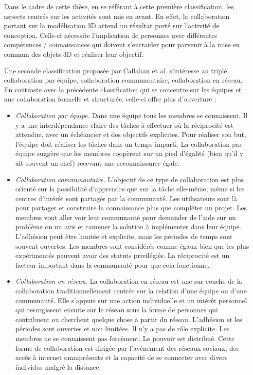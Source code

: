 Dans le cadre de cette thèse, en se référant à cette première classification, les 
aspects centrés sur les activités sont mis en avant. En effet, la collaboration 
portant sur la modélisation 3D attend un résultat porté sur l'activité de conception. 
Celle-ci nécessite l'implication de personnes avec différentes compétences / 
connaissances qui doivent s'entraider pour parvenir à la mise en commun des 
objets 3D et réaliser leur objectif. 

Une seconde classification proposée par Callahan et al. 
\cite{Callahan2008} s'intéresse au triplé collaboration par équipe, collaboration 
communautaire, collaboration en réseau. En contraste avec la précédente 
classification qui se concentre sur les équipes et une collaboration formelle et 
structurée, celle-ci offre plus d'ouverture :
\begin{itemize}
	\item \textit{Collaboration par équipe.}
	Dans une équipe tous les membres se connaissent. Il y a une interdépendance 
	claire des tâches à effectuer où la réciprocité est attendue, avec un échéancier 
	et des objectifs explicites. Pour réaliser son but, l'équipe doit réaliser les tâches 
	dans un temps imparti. La collaboration par équipe suggère que les membres 
	coopèrent sur un pied d'égalité (bien qu'il y ait souvent un chef) recevant une 
	reconnaissance égale.
	
	\item \textit{Collaboration communautaire.}
	L'objectif de ce type de collaboration est plus orienté sur la possibilité 
	d'apprendre que sur la tâche elle-même, même si les centres d'intérêt sont 
	partagés par la communauté. Les utilisateurs sont là pour partager et construire 
	la connaissance plus que compléter un projet. Les membres vont aller voir leur 
	communauté pour demander de l'aide sur un problème ou un avis et ramener la 
	solution à implémenter dans leur équipe. L'adhésion peut être limitée et 
	explicite, mais les périodes de temps sont souvent ouvertes. Les membres 
	sont considérés comme égaux bien que les plus expérimentés peuvent avoir 
	des statuts privilégiés. La réciprocité est un facteur important dans la 
	communauté pour que cela fonctionne.
	
	\item \textit{Collaboration en réseau.}
	La collaboration en réseau est une sur-couche de la collaboration 
	traditionnellement centrée sur la relation d'une équipe ou d'une communauté. 
	Elle s'appuie sur une action individuelle et un intérêt personnel qui resurgissent 
	ensuite sur le réseau sous la forme de personnes qui contribuent ou cherchent 
	quelque chose à partir du réseau. L'adhésion et les périodes sont ouvertes et 
	non limitées. Il n'y a pas de rôle explicite. Les membres ne se connaissent pas 
	forcément. Le pouvoir est distribué. Cette forme de collaboration est dirigée par 
	l'avènement des réseaux sociaux, des accès à internet omniprésents et la 
	capacité de se connecter avec divers individus malgré la distance.
\end{itemize}

